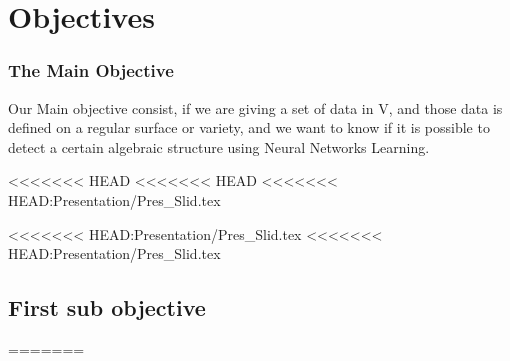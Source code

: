 \documentclass{beamer}
\begin{document}
\section{Objectives}
\begin{frame}
    \frametitle{The Main Objective}
    Our Main objective consist,  if we are giving a set of data in V, and those data is defined on a regular surface or variety, and we want to know if it is possible to detect a certain algebraic structure using Neural Networks Learning.
\end{frame}
<<<<<<< HEAD
<<<<<<< HEAD
<<<<<<< HEAD:Presentation/Pres_Slid.tex

<<<<<<< HEAD:Presentation/Pres_Slid.tex
<<<<<<< HEAD:Presentation/Pres_Slid.tex
\subsection{First sub objective} 
=======
\end{document}
